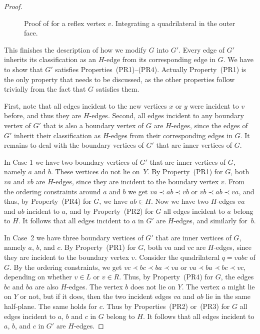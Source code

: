 \begin{proof}
	\begin{figure}
		\caption{Proof of  for a reflex
			vertex $v$. Integrating a quadrilateral in the outer face.}
	\end{figure}
	
	
	
	This finishes the description of how we modify $G$ into $G'$. Every edge of $G'$ inherits its classification as an $H$-edge from its corresponding edge in $G$. We have to show that $G'$ satisfies Properties~(PR1)--(PR4). Actually Property~(PR1) is the only property that needs to be discussed, as the other properties follow trivially from the fact that $G$ satisfies them. 
%	
%	
	
	First, note that all edges incident to the new vertices $x$ or $y$ were incident to $v$
	before, and thus they are $H$-edges. Second, all edges incident to any boundary vertex of $G'$ that is also a boundary vertex of $G$ are $H$-edges, since the edges of $G'$ inherit their classification as $H$-edges from their corresponding edges in $G$. It remains to deal with the boundary vertices of $G'$ that are inner vertices of $G$.  
	
	In Case 1 we have two boundary vertices of $G'$ that are inner
        vertices of $G$, namely $a$ and $b$. These vertices do not lie
        on~$Y$. By Property~(PR1) for $G$, both $va$ and $vb$ are $H$-edges, since they are incident to the boundary vertex $v$. From the ordering constraints around $a$ and $b$ we get $va\prec ab\prec vb$
	or
	$vb\prec ab\prec va$, and thus, by Property~(PR4) for $G$, we have $ab\in H$.
	Now we have two $H$-edges $va$ and $ab$ incident to $a$,
	and by Property~(PR2) for $G$ all edges incident
	to $a$ belong to $H$. It follows that all edges incident to $a$ in $G'$ are $H$-edges, and similarly for~$b$.
	
	In Case~2 we have three boundary vertices of $G'$ that are
        inner vertices of $G$, namely $a$, $b$, and $c$. By
        Property~(PR1) for $G$, both $va$ and $vc$ are $H$-edges, since they are incident to the boundary vertex $v$. Consider the quadrilateral $q=vabc$ of $G$. By the ordering constraints, we get
	$vc \prec bc\prec ba\prec va$ or $va \prec ba\prec bc\prec vc$,
	depending on whether $v\in L$ or $v\in R$. Thus, by Property~(PR4) for $G$, the edges $bc$ and $ba$ are also $H$-edges. The vertex $b$ does not lie on $Y$. The vertex $a$ might lie on $Y$ or not, but if it does, then the two incident edges $va$ and $ab$ lie in the same half-plane.
	The same holds for $c$. Thus by Properties~(PR2) or~(PR3) for $G$ all edges incident
	to $a$, $b$ and $c$ in $G$ belong to $H$. It follows that all edges incident to $a$, $b$, and $c$ in $G'$ are $H$-edges.
	

\end{proof}
